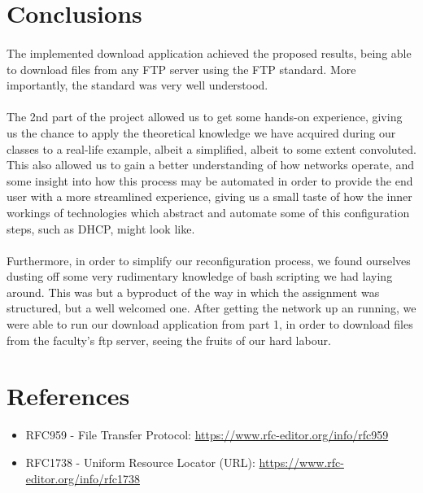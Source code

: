 \documentclass[11pt]{article}
\begin{document}
\section*{Conclusions}

\paragraph{}The implemented download application achieved the proposed results, being able to download files from any FTP server using the FTP standard. More importantly, the standard was very well understood.

\paragraph{}The 2nd part of the project allowed us to get some hands-on experience, giving us the chance to apply the theoretical knowledge we have acquired during our classes to a real-life example, albeit a simplified, albeit to some extent convoluted. This also allowed us to gain a better understanding of how networks operate, and some insight into how this process may be automated in order to provide the end user with a more streamlined experience, giving us a small taste of how the inner workings of technologies which abstract and automate some of this configuration steps, such as DHCP, might look like.

\paragraph{}Furthermore, in order to simplify our reconfiguration process, we found ourselves dusting off some very rudimentary knowledge of bash scripting we had laying around. This was but a byproduct of the way in which the assignment was structured, but a well welcomed one. After getting the network up an running, we were able to run our download application from part 1, in order to download files from the faculty's ftp server, seeing the fruits of our hard labour.

\section*{References}

\begin{itemize}
    \item{RFC959 - File Transfer Protocol: \url{https://www.rfc-editor.org/info/rfc959}}
    \item{RFC1738 - Uniform Resource Locator (URL): \url{https://www.rfc-editor.org/info/rfc1738}}
\end{itemize}
\end{document}
